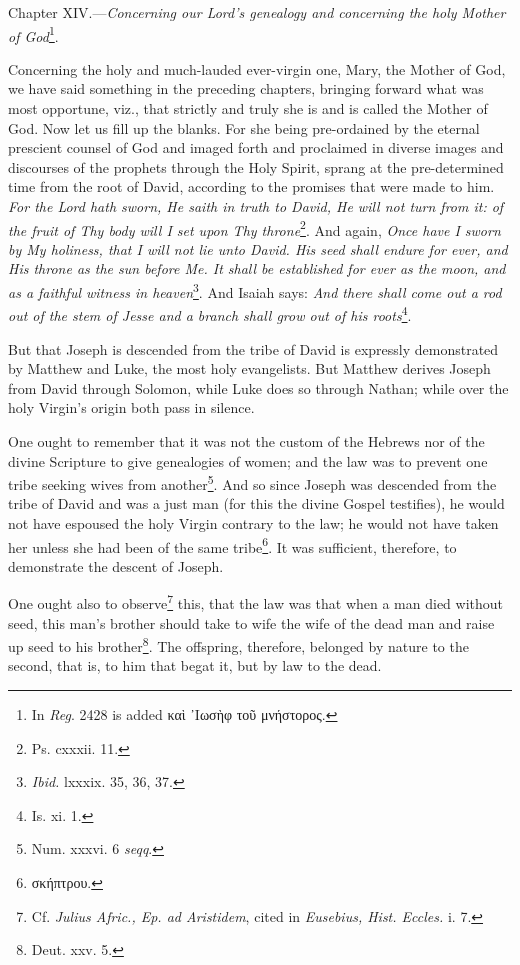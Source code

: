 
Chapter XIV.—\emph{Concerning our Lord’s genealogy and concerning the holy Mother of God}\footnote{In \emph{Reg}. 2428 is added \textgreek{καὶ ᾽Ιωσὴφ τοῦ μνήστορος}.}.

Concerning the holy and much-lauded ever-virgin one, Mary, the Mother of God, we have said something in the preceding chapters, bringing forward what was most opportune, viz., that strictly and truly she is and is called the Mother of God. Now let us fill up the blanks. For she being pre-ordained by the eternal prescient counsel of God and imaged forth and proclaimed in diverse images and discourses of the prophets through the Holy Spirit, sprang at the pre-determined time from the root of David, according to the promises that were made to him. \emph{For the Lord hath sworn, He saith in truth to David, He will not turn from it: of the fruit of Thy body will I set upon Thy throne}\footnote{Ps. cxxxii. 11.}. And again, \emph{Once have I sworn by My holiness, that I will not lie unto David. His seed shall endure for ever, and His throne as the sun before Me. It shall be established for ever as the moon, and as a faithful witness in heaven}\footnote{\emph{Ibid.} lxxxix. 35, 36, 37.}. And Isaiah says: \emph{And there shall come out a rod out of the stem of Jesse and a branch shall grow out of his roots}\footnote{Is. xi. 1.}.

But that Joseph is descended from the tribe of David is expressly demonstrated by Matthew and Luke, the most holy evangelists. But Matthew derives Joseph from David through Solomon, while Luke does so through Nathan; while over the holy Virgin’s origin both pass in silence.

One ought to remember that it was not the custom of the Hebrews nor of the divine Scripture to give genealogies of women; and the law was to prevent one tribe seeking wives from another\footnote{Num. xxxvi. 6 \emph{seqq}.}. And so since Joseph was descended from the tribe of David and was a just man (for this the divine Gospel testifies), he would not have espoused the holy Virgin contrary to the law; he would not have taken her unless she had been of the same tribe\footnote{\textgreek{σκήπτρου}.}. It was sufficient, therefore, to demonstrate the descent of Joseph.

One ought also to observe\footnote{Cf. \emph{Julius Afric., Ep. ad Aristidem}, cited in \emph{Eusebius, Hist. Eccles. }i. 7.} this, that the law was that when a man died without seed, this man’s brother should take to wife the wife of the dead man and raise up seed to his brother\footnote{Deut. xxv. 5.}. The offspring, therefore, belonged by nature to the second, that is, to him that begat it, but by law to the dead.


